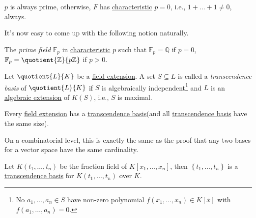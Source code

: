 
\begin{remark}
	\(p\) is always prime, otherwise, \(F\) has \hyperref[def:characteristic]{characteristic} \(p = 0\), i.e., \(1 + \ldots + 1 \neq 0\), always.
\end{remark}

It's now easy to come up with the following notion naturally.

\begin{definition}\label{def:prime-field}
	The \emph{prime field} \(\mathbb{F} _p\) in \hyperref[def:characteristic]{characteristic} \(p\) such that \(\mathbb{F} _p = \mathbb{Q} \) if \(p = 0\), \(\mathbb{F} _p = \quotient{\mathbb{Z} }{p\mathbb{Z} } \) if \(p > 0\).
\end{definition}

\begin{definition}\label{def:transcendence-basis}
	Let \(\quotient{L}{K} \) be a \hyperref[def:field-extension]{field extension}. A set \(S \subseteq L\) is called a \emph{transcendence basis} of \(\quotient{L}{K} \) if \(S\) is algebraically independent\footnote{No \(a_1, \ldots , a_n\in S\) have non-zero polynomial \(f(x_1, \ldots , x_n) \in K[\overline{x} ]\) with \(f(a_1, \ldots , a_n) = 0\).} and \(L\) is an \hyperref[def:algebraic-extension]{algebraic extension} of \(K(S)\), i.e., \(S\) is maximal.
\end{definition}

\begin{remark}
	Every \hyperref[def:field-extension]{field extension} has a \hyperref[def:transcendence-basis]{transcendence basis}(and all \hyperref[def:transcendence-basis]{transcendence basis} have the same size).
\end{remark}
\begin{explanation}
	On a combinatorial level, this is exactly the same as the proof that any two bases for a vector space have the same cardinality.
\end{explanation}

\begin{eg}
	Let \(K(t_1, \ldots , t_n)\) be the fraction field of \(K[x_1, \ldots , x_n]\), then \(\left\{ t_1, \ldots , t_n \right\} \) is a \hyperref[def:transcendence-basis]{transcendence basis} for \(K(t_1, \ldots , t_n)\) over \(K\).
\end{eg}

